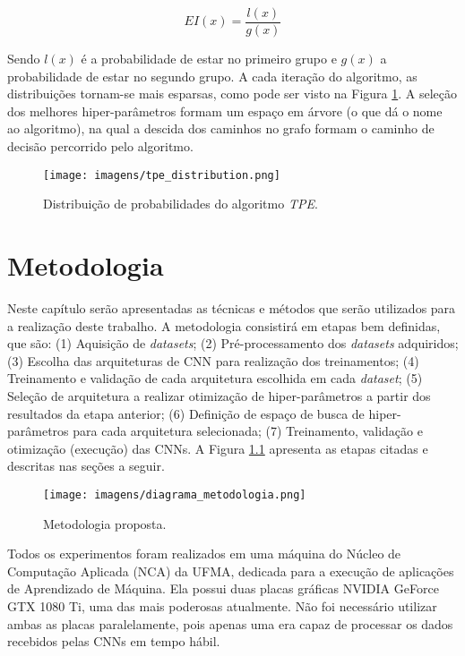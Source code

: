 \documentclass[
12pt,       %
openright,      %
oneside,      %
a4paper,      %
english,      %
french,       %
spanish,      %
brazil        %
]{abntex2}
\begin{document}
\[EI(x) = \frac{l(x)}{g(x)}\]

Sendo $l(x)$ é a probabilidade de estar no primeiro grupo e $g(x)$ a probabilidade de estar no segundo grupo. A cada iteração do algoritmo, as distribuições tornam-se mais esparsas, como pode ser visto na Figura \ref{fig:tpe_distribution}. A seleção dos melhores hiper-parâmetros formam um espaço em árvore (o que dá o nome ao algoritmo), na qual a descida dos caminhos no grafo formam o caminho de decisão percorrido pelo algoritmo.

\begin{figure}[ht]
\centering
\caption{Distribuição de probabilidades do algoritmo \textit{TPE}.}
\texttt{[image: imagens/tpe\_distribution.png]}
\label{fig:tpe_distribution}
\end{figure}

\chapter{Metodologia} \label{metodologia}

Neste capítulo serão apresentadas as técnicas e métodos que serão utilizados para a realização deste trabalho.
A metodologia consistirá em etapas bem definidas, que são: (1) Aquisição de \textit{datasets}; (2) Pré-processamento dos \textit{datasets} adquiridos; (3) Escolha das arquiteturas de CNN para realização dos treinamentos; (4) Treinamento e validação de cada arquitetura escolhida em cada \textit{dataset}; (5) Seleção de arquitetura a realizar otimização de hiper-parâmetros a partir dos resultados da etapa anterior; (6) Definição de espaço de busca de hiper-parâmetros para cada arquitetura selecionada; (7) Treinamento, validação e otimização (execução) das CNNs. A Figura \ref{fig:diagrama_metodologia} apresenta as etapas citadas e descritas nas seções a seguir.
  
\begin{figure}[ht]
\centering
\caption{Metodologia proposta.}
\texttt{[image: imagens/diagrama\_metodologia.png]}
\label{fig:diagrama_metodologia}
\end{figure}

Todos os experimentos foram realizados em uma máquina do Núcleo de Computação Aplicada (NCA) da UFMA, dedicada para a execução de aplicações de Aprendizado de Máquina. Ela possui duas placas gráficas NVIDIA GeForce GTX 1080 Ti, uma das mais poderosas atualmente. Não foi necessário utilizar ambas as placas paralelamente, pois apenas uma era capaz de processar os dados recebidos pelas CNNs em tempo hábil.
\end{document}
